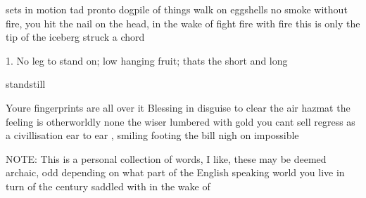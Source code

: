 \begin{center}
\end{center}

sets in motion
tad
pronto
dogpile of things
walk on eggshells
no smoke without fire, you hit the nail on the head, in the wake of
fight fire with fire
this is only the tip of the iceberg
struck a chord

1. No leg to stand on; low hanging fruit; thats the short and long

standstill

Youre fingerprints are all over it
Blessing in disguise
to clear the air
hazmat
the feeling is otherworldly
none the wiser
lumbered with gold you cant sell
regress as a civillisation
ear to ear , smiling
footing the bill
nigh on impossible

NOTE: This is a personal collection of words, I like, these may be deemed archaic, odd depending on what part of the English speaking world you live in
turn of the century
saddled with
in the wake of

